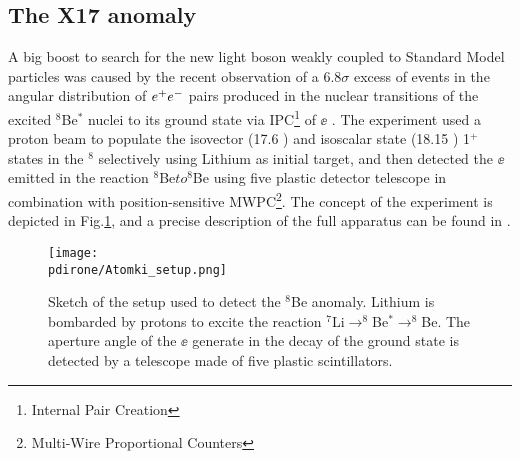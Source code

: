 \subsection{The X17 anomaly}
\label{ch1:sec:dm-u1model-motivations-x17}

A big boost to search for the new light boson weakly coupled to Standard Model particles was caused by the recent observation of a 6.8$\sigma$ excess of events in the angular distribution of $e^+e^-$ pairs produced in the nuclear transitions of the excited $^8$Be$^*$ nuclei to its ground state via IPC\footnote{Internal Pair Creation} of $\ee$ \cite{Krasznahorkay:2015iga}. The experiment used a proton beam to populate the isovector (17.6 \mev) and isoscalar state (18.15 \mev) 1$^+$ states in the $^8$ selectively using Lithium as initial target, and then detected the $\ee$ emitted in the reaction $^8$Be$to ^8$Be using five plastic detector telescope in combination with position-sensitive MWPC\footnote{Multi-Wire Proportional Counters}. The concept of the experiment is depicted in Fig.\ref{fig:x17-setup}, and a precise description of the full apparatus can be found in \cite{GULYAS201621}.

\begin{figure}[htb!]
  \centering
  \texttt{[image: \\pdirone/Atomki\_setup.png]}
  \caption[Sketch of the setup used to detect the $^8$Be anomaly.]{Sketch of the setup used to detect the $^8$Be anomaly. Lithium is bombarded by protons to excite the reaction $^7$Li$\to ^8$Be$^* \to ^8$Be. The aperture angle of the $\ee$ generate in the decay of the ground state is detected by a telescope made of five plastic scintillators. \cite{PhysRevD.95.035017}}
  \label{fig:x17-setup}
\end{figure}

